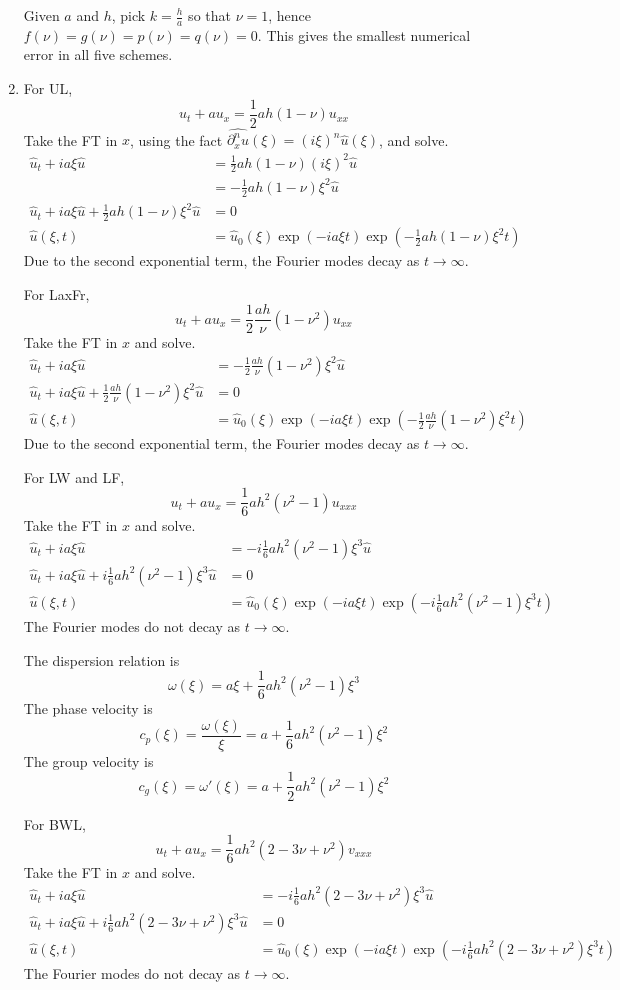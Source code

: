 \documentclass{article}
\newcommand{\ptl}{\partial}
\begin{document}
\begin{enumerate}[label=(\alph*)]
Given $a$ and $h$, pick $k=\frac ha$ so that $\nu=1$, hence $f(\nu)=g(\nu)=p(\nu)=q(\nu)=0$. This gives the smallest numerical error in all five schemes.


\item For UL,
$$u_t + au_x = \frac12ah(1-\nu)u_{xx}$$
Take the FT in $x$, using the fact $\widehat{\ptl_x^nu}(\xi)=(i\xi)^n\hat u(\xi)$, and solve.
\begin{align*}
	\hat u_t + ia\xi\hat u &= \frac12ah(1-\nu)(i\xi)^2\hat u\\
	&= -\frac12ah(1-\nu)\xi^2\hat u\\
	\hat u_t + ia\xi\hat u + \frac12ah(1-\nu)\xi^2\hat u &= 0\\
	\hat u(\xi,t) &= \hat u_0(\xi)\exp(-ia\xi t)\exp(-\frac12ah(1-\nu)\xi^2t)
\end{align*}
Due to the second exponential term, the Fourier modes decay as $t\to\infty$.

For LaxFr,
$$u_t + au_x = \frac12\frac{ah}{\nu}(1-\nu^2)u_{xx}$$
Take the FT in $x$ and solve.
\begin{align*}
	\hat u_t + ia\xi\hat u &= -\frac12\frac{ah}{\nu}(1-\nu^2)\xi^2\hat u\\
	\hat u_t + ia\xi\hat u + \frac12\frac{ah}{\nu}(1-\nu^2)\xi^2\hat u &= 0\\
	\hat u(\xi,t) &= \hat u_0(\xi)\exp(-ia\xi t)\exp(-\frac12\frac{ah}{\nu}(1-\nu^2)\xi^2t)
\end{align*}
Due to the second exponential term, the Fourier modes decay as $t\to\infty$.

For LW and LF,
$$u_t + au_x = \frac16ah^2(\nu^2-1)u_{xxx}$$
Take the FT in $x$ and solve.
\begin{align*}
	\hat u_t + ia\xi\hat u &= -i\frac16ah^2(\nu^2-1)\xi^3\hat u\\
	\hat u_t + ia\xi\hat u + i\frac16ah^2(\nu^2-1)\xi^3\hat u &= 0\\
	\hat u(\xi,t) &= \hat u_0(\xi)\exp(-ia\xi t)\exp(-i\frac16ah^2(\nu^2-1)\xi^3t)
\end{align*}
The Fourier modes do not decay as $t\to\infty$.

The dispersion relation is
$$\omega(\xi) = a\xi + \frac16ah^2(\nu^2-1)\xi^3$$
The phase velocity is
$$c_p(\xi) = \frac{\omega(\xi)}{\xi} = a + \frac16ah^2(\nu^2-1)\xi^2$$
The group velocity is
$$c_g(\xi) = \omega'(\xi) = a + \frac12ah^2(\nu^2-1)\xi^2$$

For BWL,
$$u_t + au_x = \frac16ah^2(2-3\nu+\nu^2)v_{xxx}$$
Take the FT in $x$ and solve.
\begin{align*}
	\hat u_t + ia\xi\hat u &= -i\frac16ah^2(2-3\nu+\nu^2)\xi^3\hat u\\
	\hat u_t + ia\xi\hat u + i\frac16ah^2(2-3\nu+\nu^2)\xi^3\hat u &= 0\\
	\hat u(\xi,t) &= \hat u_0(\xi)\exp(-ia\xi t)\exp(-i\frac16ah^2(2-3\nu+\nu^2)\xi^3t)
\end{align*}
The Fourier modes do not decay as $t\to\infty$.


\end{enumerate}
\end{document}
